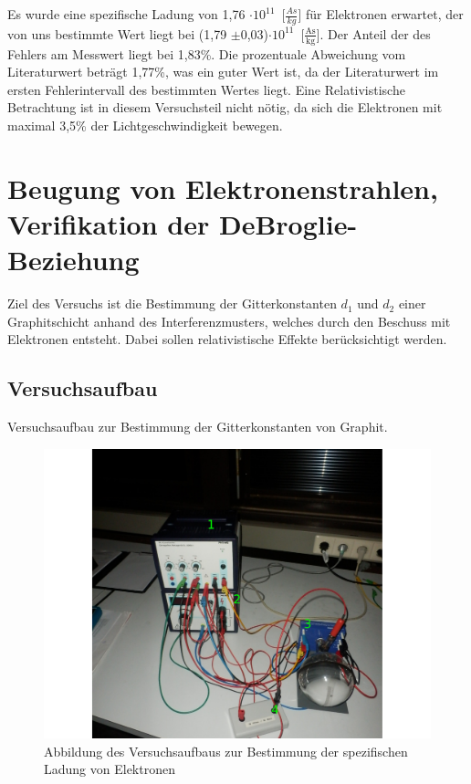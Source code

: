 \documentclass[12pt,a4paper]{article}
\begin{document}
Es wurde eine spezifische Ladung von \unit{1,76 $\cdot 10^{11}$}[$\frac{As}{kg}$] für Elektronen erwartet, der von uns bestimmte Wert liegt bei \unit{(1,79 $\pm$0,03)$\cdot 10^{11}$}[$\frac{\text{As}}{\text{kg}}$]. Der Anteil der des Fehlers am Messwert liegt bei 1,83\%. Die prozentuale Abweichung vom Literaturwert beträgt 1,77\%, was ein guter Wert ist, da der Literaturwert im ersten Fehlerintervall des bestimmten Wertes liegt. Eine Relativistische Betrachtung ist in diesem Versuchsteil nicht nötig, da sich die Elektronen mit maximal 3,5\% der Lichtgeschwindigkeit bewegen.

\section{Beugung von Elektronenstrahlen, Verifikation der DeBroglie-Beziehung}
Ziel des Versuchs ist die Bestimmung der Gitterkonstanten $d_1$ und $d_2$ einer Graphitschicht anhand des Interferenzmusters, welches durch den Beschuss mit Elektronen entsteht. Dabei sollen relativistische Effekte berücksichtigt werden.
\subsection{Versuchsaufbau}

Versuchsaufbau zur Bestimmung der Gitterkonstanten von Graphit.

\begin{figure}[H] 
  \centering
    \includegraphics[scale = 0.3]{aufbau_b.pdf}
  	\caption[Abbildung des Versuchsaufbaus zur Bestimmung der spezifischen Ladung von Elektronen]{Abbildung des Versuchsaufbaus zur Bestimmung der spezifischen Ladung von Elektronen}
  \label{fig:aufbau_h}
\end{figure}
\end{document}
